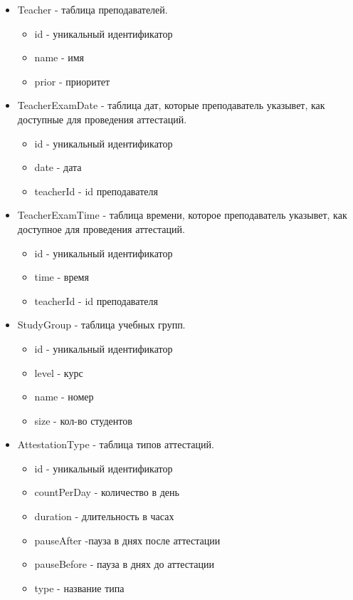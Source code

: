 \begin{itemize}
	\item Teacher - таблица преподавателей.
	\begin{itemize}
		\item id - уникальный идентификатор
		\item name - имя
		\item prior - приоритет
	\end{itemize} 
	
	\item TeacherExamDate - таблица дат, которые преподаватель указывет, как доступные для проведения аттестаций. 
	\begin{itemize}
		\item id - уникальный идентификатор
		\item date - дата
		\item teacherId - id преподавателя
	\end{itemize} 
	
	\item TeacherExamTime - таблица времени, которое преподаватель указывет, как доступное для проведения аттестаций.
	\begin{itemize}
		\item id - уникальный идентификатор
		\item time - время
		\item teacherId - id преподавателя
	\end{itemize} 
		
	\item StudyGroup - таблица учебных групп.
	\begin{itemize}
		\item id - уникальный идентификатор
		\item level - курс
		\item name - номер
		\item size - кол-во студентов
	\end{itemize} 

	\item AttestationType - таблица типов аттестаций.
	\begin{itemize}
		\item id - уникальный идентификатор
		\item countPerDay - количество в день
		\item duration - длительность в часах
		\item pauseAfter -пауза в днях после аттестации
		\item pauseBefore - пауза в днях до аттестации
		\item type - название типа
	\end{itemize} 


\end{itemize}
